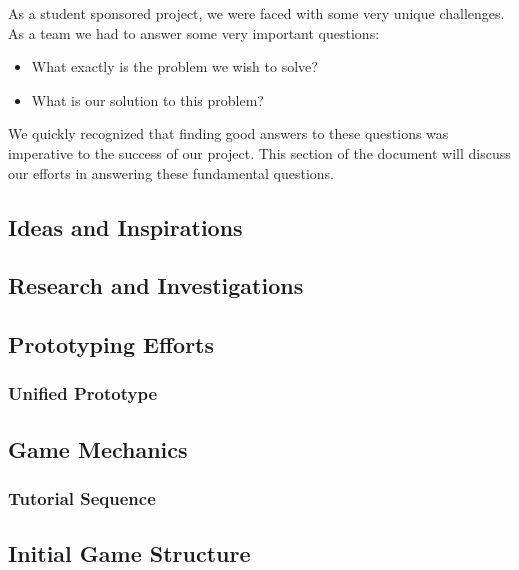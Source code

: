 As a student sponsored project, we were faced with some very unique
challenges. As a team we had to answer some very important questions:

\begin{itemize}
    \item What exactly is the problem we wish to solve?
    \item What is our solution to this problem?
\end{itemize}

We quickly recognized that finding good answers to these questions was imperative to the success of our project.
This section of the document will discuss our efforts in answering these fundamental questions.

\subsection{Ideas and Inspirations}
  
\newpage

\subsection{Research and Investigations}
  
\newpage

\subsection{Prototyping Efforts}
  

  \subsubsection{Unified Prototype}
\newpage

\subsection{Game Mechanics}
\subsubsection{Tutorial Sequence}
\label{section:tutorial}
  
\newpage

\subsection{Initial Game Structure}

\newpage